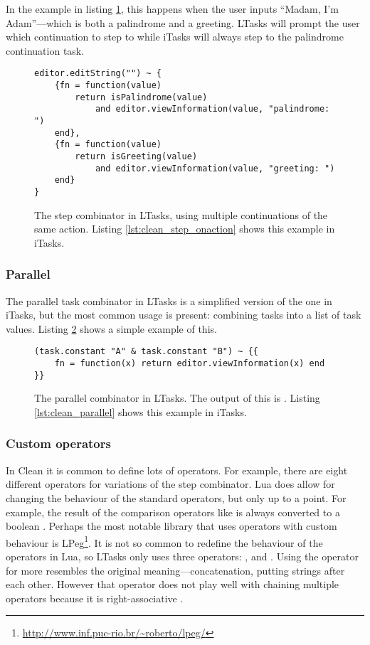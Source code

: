 In the example in listing \ref{lst:ltasks_step}, this happens when the user inputs ``Madam, I'm Adam''---which is both a palindrome and a greeting. LTasks will prompt the user which continuation to step to while iTasks will always step to the palindrome continuation task.

\begin{figure}[ht]
\centering
\begin{verbatim}
editor.editString("") ~ {
    {fn = function(value)
        return isPalindrome(value)
            and editor.viewInformation(value, "palindrome: ")
    end},
    {fn = function(value)
        return isGreeting(value)
            and editor.viewInformation(value, "greeting: ")
    end}
}
\end{verbatim}
\caption{The step combinator in LTasks, using multiple  continuations of the same action. Listing \ref{lst:clean_step_onaction} shows this example in iTasks.}
\label{lst:ltasks_step}
\end{figure}

\subsubsection{Parallel}
The parallel task combinator in LTasks is a simplified version of the one in iTasks, but the most common usage is present: combining tasks into a list of task values. Listing \ref{lst:ltasks_parallel} shows a simple example of this.

\begin{figure}[ht]
\centering
\begin{verbatim}
(task.constant "A" & task.constant "B") ~ {{
    fn = function(x) return editor.viewInformation(x) end
}}
\end{verbatim}
\caption{The parallel combinator in LTasks. The output of this is . Listing \ref{lst:clean_parallel} shows this example in iTasks.}
\label{lst:ltasks_parallel}
\end{figure}

\subsubsection{Custom operators}
In Clean it is common to define lots of operators. For example, there are eight different operators for variations of the step combinator. Lua does allow for changing the behaviour of the standard operators, but only up to a point. For example, the result of the comparison operators like \lua{<} is always converted to a boolean \cite{luareferencemanual}. Perhaps the most notable library that uses operators with custom behaviour is LPeg\footnote{\url{http://www.inf.puc-rio.br/~roberto/lpeg/}}. It is not so common to redefine the behaviour of the operators in Lua, so LTasks only uses three operators: \lua{~}, \lua{&} and \lua{|}. Using the  operator for  more resembles the original meaning---concatenation, putting strings after each other. However that operator does not play well with chaining multiple operators because it is right-associative \cite[\S 3.4.8]{luareferencemanual}.

